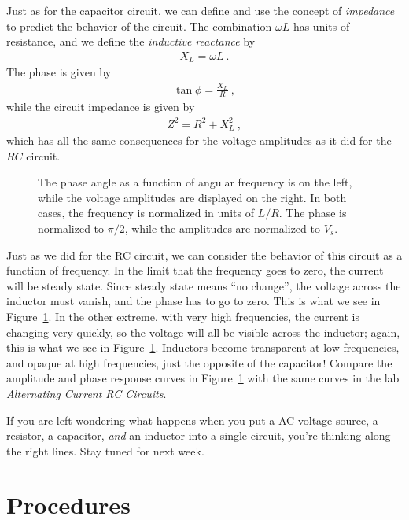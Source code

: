 \documentclass[12pt]{article}
\begin{document}
Just as for the capacitor circuit, we can define and use the concept
of \textit{impedance} to predict the behavior of the circuit.  The
combination $\omega L$ has units of resistance, and we
define the \textit{inductive reactance} by
\begin{gather*}
  X_L = \omega L\ .
\end{gather*}
The phase is given by
\begin{gather*}
  \tan\phi = \frac{X_L}{R}\ ,
\end{gather*}
while the circuit impedance is given by
\begin{gather*}
  Z^2 = R^2 + X_L^2\ ,
\end{gather*}
which has all the same consequences for the voltage amplitudes as it
did for the $RC$ circuit.

\begin{figure}
  \centering
  \caption{The phase angle as a function of angular frequency is on
    the left, while the voltage amplitudes are displayed on the
    right.  In both cases, the frequency is normalized in units of
    $L/R$.  The phase is normalized to $\pi/2$, while the amplitudes
    are normalized to $V_s$.}
  \label{fig:frequency}
\end{figure}
Just as we did for the RC circuit, we can consider the behavior of
this circuit as a function of frequency.  In the limit that the
frequency goes to zero, the current will be steady state.  Since
steady state means ``no change'', the voltage across the inductor must
vanish, and the phase has to go to zero.  This is what we see in
Figure~\ref{fig:frequency}.  In the other extreme, with very high
frequencies, the current is changing very quickly, so the voltage will
all be visible across the inductor; again, this is what we see in
Figure~\ref{fig:frequency}.  Inductors become transparent at low
frequencies, and opaque at high frequencies, just the opposite of the
capacitor!  Compare the amplitude and phase response curves in
Figure~\ref{fig:frequency} with the same curves in the lab
\textit{Alternating Current RC Circuits}.

If you are left wondering what happens when you put a AC voltage
source, a resistor, a capacitor, \textit{and} an inductor into a
single circuit, you're thinking along the right lines.  Stay tuned for
next week.

\section{Procedures}
\label{sec:procedures}
\end{document}
